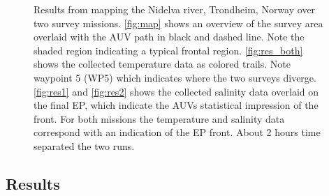 \documentclass[aoas]{imsart}
\begin{document}
\begin{figure}[!h]
\hspace{0.2cm}
\caption{Results from mapping the Nidelva river, Trondheim, Norway
  over two survey missions. \ref{fig:map} shows an overview of the
  survey area overlaid with the AUV path in black and dashed
  line. Note the shaded region indicating a typical frontal
  region. \ref{fig:res_both} shows the collected temperature data as
  colored trails. Note waypoint 5 (WP5) which indicates where the two
  surveys diverge. \ref{fig:res1} and \ref{fig:res2} shows the
  collected salinity data overlaid on the final EP, which indicate the
  AUVs statistical impression of the front. For both missions the
  temperature and salinity data correspond with an indication of the
  EP front. About 2 hours time separated the two runs.}
\label{fig:results}
\end{figure}

\subsection{Results}
\end{document}
